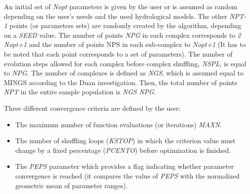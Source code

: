 \documentclass[
  letterpaper,
  DIV=11,
  numbers=noendperiod]{scrreprt}
\begin{document}
An initial set of \emph{Nopt} parameters is given by the user or is
assumed as random depending on the user's needs and the used
hydrological models. The other \emph{NPT-1} points (or parameters sets)
are randomly created by the algorithm, depending on a \emph{SEED} value.
The number of points \emph{NPG} in each complex corresponds to \emph{2
\cdot Nopt+1} and the number of points NPS in each sub-complex to
\emph{Nopt+1} (It has to be noted that each point corresponds to a set
of parameters). The number of evolution steps allowed for each complex
before complex shuffling, \emph{NSPL}, is equal to \emph{NPG}. The
number of complexes is defined as \emph{NGS}, which is assumed equal to
MINGS according to the Duan investigation. Then, the total number of
points \emph{NPT} in the entire sample population is \emph{NGS
\cdot NPG}.

Three different convergence criteria are defined by the user:

\begin{itemize}
\item
  The maximum number of function evaluations (or iterations)
  \emph{MAXN}.
\item
  The number of shuffling loops (\emph{KSTOP}) in which the criterion
  value must change by a fixed percentage (\emph{PCENTO}) before
  optimization is finished.
\item
  The \emph{PEPS} parameter which provides a flag indicating whether
  parameter convergence is reached (it compares the value of \emph{PEPS}
  with the normalized geometric mean of parameter ranges).
\end{itemize}
\end{document}
